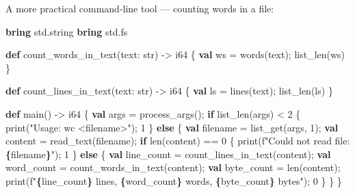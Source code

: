\documentclass[
  english,
]{book}
\newenvironment{Shaded}{\begin{snugshade}}{\end{snugshade}}
\newcommand{\ControlFlowTok}[1]{\textcolor[rgb]{0.77,0.53,0.75}{\textbf{#1}}}
\newcommand{\DataTypeTok}[1]{\textcolor[rgb]{0.31,0.79,0.69}{#1}}
\newcommand{\DecValTok}[1]{\textcolor[rgb]{0.71,0.81,0.66}{#1}}
\newcommand{\FunctionTok}[1]{\textcolor[rgb]{0.86,0.86,0.67}{#1}}
\newcommand{\KeywordTok}[1]{\textcolor[rgb]{0.34,0.61,0.84}{\textbf{#1}}}
\newcommand{\NormalTok}[1]{\textcolor[rgb]{0.83,0.83,0.83}{#1}}
\newcommand{\OperatorTok}[1]{\textcolor[rgb]{0.83,0.83,0.83}{#1}}
\newcommand{\StringTok}[1]{\textcolor[rgb]{0.81,0.57,0.47}{#1}}
\begin{document}
A more practical command-line tool --- counting words in a file:

\begin{Shaded}
\begin{Highlighting}[]
\KeywordTok{bring}\NormalTok{ std}\OperatorTok{.}\NormalTok{string}
\KeywordTok{bring}\NormalTok{ std}\OperatorTok{.}\NormalTok{fs}

\KeywordTok{def}\NormalTok{ count\_words\_in\_text(text: }\DataTypeTok{str}\NormalTok{) }\OperatorTok{{-}\textgreater{}} \DataTypeTok{i64}\NormalTok{ \{}
    \KeywordTok{val}\NormalTok{ ws }\OperatorTok{=}\NormalTok{ words(text);}
    \FunctionTok{list\_len}\NormalTok{(ws)}
\NormalTok{\}}

\KeywordTok{def}\NormalTok{ count\_lines\_in\_text(text: }\DataTypeTok{str}\NormalTok{) }\OperatorTok{{-}\textgreater{}} \DataTypeTok{i64}\NormalTok{ \{}
    \KeywordTok{val}\NormalTok{ ls }\OperatorTok{=}\NormalTok{ lines(text);}
    \FunctionTok{list\_len}\NormalTok{(ls)}
\NormalTok{\}}

\KeywordTok{def}\NormalTok{ main() }\OperatorTok{{-}\textgreater{}} \DataTypeTok{i64}\NormalTok{ \{}
    \KeywordTok{val}\NormalTok{ args }\OperatorTok{=}\NormalTok{ process\_args();}
    \ControlFlowTok{if} \FunctionTok{list\_len}\NormalTok{(args) }\OperatorTok{\textless{}} \DecValTok{2}\NormalTok{ \{}
        \FunctionTok{print}\NormalTok{(}\StringTok{"Usage: wc \textless{}filename\textgreater{}"}\NormalTok{);}
        \DecValTok{1}
\NormalTok{    \} }\ControlFlowTok{else}\NormalTok{ \{}
        \KeywordTok{val}\NormalTok{ filename }\OperatorTok{=} \FunctionTok{list\_get}\NormalTok{(args, }\DecValTok{1}\NormalTok{);}
        \KeywordTok{val}\NormalTok{ content }\OperatorTok{=}\NormalTok{ read\_text(filename);}
        \ControlFlowTok{if} \FunctionTok{len}\NormalTok{(content) }\OperatorTok{==} \DecValTok{0}\NormalTok{ \{}
            \FunctionTok{print}\NormalTok{(}\StringTok{f"Could not read file: }\ControlFlowTok{\{}\NormalTok{filename}\ControlFlowTok{\}}\StringTok{"}\NormalTok{);}
            \DecValTok{1}
\NormalTok{        \} }\ControlFlowTok{else}\NormalTok{ \{}
            \KeywordTok{val}\NormalTok{ line\_count }\OperatorTok{=}\NormalTok{ count\_lines\_in\_text(content);}
            \KeywordTok{val}\NormalTok{ word\_count }\OperatorTok{=}\NormalTok{ count\_words\_in\_text(content);}
            \KeywordTok{val}\NormalTok{ byte\_count }\OperatorTok{=} \FunctionTok{len}\NormalTok{(content);}
            \FunctionTok{print}\NormalTok{(}\StringTok{f"}\ControlFlowTok{\{}\NormalTok{line\_count}\ControlFlowTok{\}}\StringTok{ lines, }\ControlFlowTok{\{}\NormalTok{word\_count}\ControlFlowTok{\}}\StringTok{ words, }\ControlFlowTok{\{}\NormalTok{byte\_count}\ControlFlowTok{\}}\StringTok{ bytes"}\NormalTok{);}
            \DecValTok{0}
\NormalTok{        \}}
\NormalTok{    \}}
\NormalTok{\}}
\end{Highlighting}
\end{Shaded}
\end{document}
